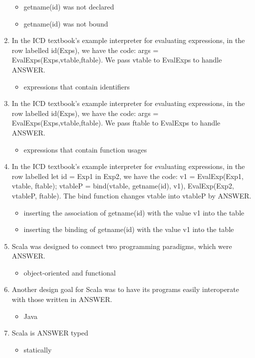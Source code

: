 \documentclass{exam}
\begin{document}
\begin{enumerate}
\begin{itemize}
\item getname(id) was not declared
\item getname(id) was not bound
\end{itemize}
\item In the ICD textbook's example interpreter for evaluating expressions, in the row labelled id(Exps), we have the code: args = EvalExps(Exps,vtable,ftable).  We pass vtable to EvalExps to handle ANSWER.
\begin{itemize}
\item expressions that contain identifiers
\end{itemize}
\item In the ICD textbook's example interpreter for evaluating expressions, in the row labelled id(Exps), we have the code: args = EvalExps(Exps,vtable,ftable).  We pass ftable to EvalExps to handle ANSWER.
\begin{itemize}
\item expressions that contain function usages
\end{itemize}
\item In the ICD textbook's example interpreter for evaluating expressions, in the row labelled let id = Exp1 in Exp2, we have the code: v1 = EvalExp(Exp1, vtable, ftable); vtableP = bind(vtable, getname(id), v1), EvalExp(Exp2, vtableP, ftable).  The bind function changes vtable into vtableP by ANSWER.
\begin{itemize}
\item inserting the association of getname(id) with the value v1 into the table
\item inserting the binding of getname(id) with the value v1 into the table
\end{itemize}
\item Scala was designed to connect two programming paradigms, which were ANSWER.
\begin{itemize}
\item object-oriented and functional
\end{itemize}
\item Another design goal for Scala was to have its programs easily interoperate with those written in ANSWER.
\begin{itemize}
\item Java
\end{itemize}
\item Scala is ANSWER typed
\begin{itemize}
\item statically
\end{itemize}

\end{enumerate}
\end{document}
